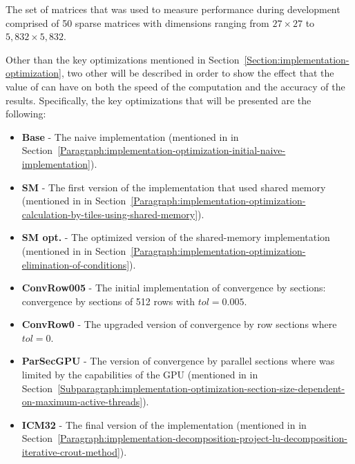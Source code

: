 The set of matrices that was used to measure performance during development comprised of 50 sparse matrices with dimensions ranging from $ 27\times 27 $ to $ 5,832\times 5,832 $.
\par Other than the key optimizations mentioned in Section~\ref{Section:implementation-optimization}, two other will be described in order to show the effect that the value of  can have on both the speed of the computation and the accuracy of the results. Specifically, the key optimizations that will be presented are the following:

\begin{itemize}
	\item \textbf{Base} - The naive implementation (mentioned in \textit{} in Section~\ref{Paragraph:implementation-optimization-initial-naive-implementation}).
	\item \textbf{SM} - The first version of the implementation that used shared memory (mentioned in \textit{} in Section~\ref{Paragraph:implementation-optimization-calculation-by-tiles-using-shared-memory}).
	\item \textbf{SM opt.} - The optimized version of the shared-memory implementation (mentioned in \textit{} in Section~\ref{Paragraph:implementation-optimization-elimination-of-conditions}).
	\item \textbf{ConvRow005} - The initial implementation of convergence by sections: convergence by sections of 512 rows with $ tol = 0.005 $.
	\item \textbf{ConvRow0} - The upgraded version of convergence by row sections where $ tol = 0 $.
	\item \textbf{ParSecGPU} - The version of convergence by parallel sections where  was limited by the capabilities of the GPU (mentioned in \textit{} in Section~\ref{Subparagraph:implementation-optimization-section-size-dependent-on-maximum-active-threads}).
	\item \textbf{ICM32} - The final version of the implementation (mentioned in \textit{} in Section~\ref{Paragraph:implementation-decomposition-project-lu-decomposition-iterative-crout-method}).
\end{itemize}

